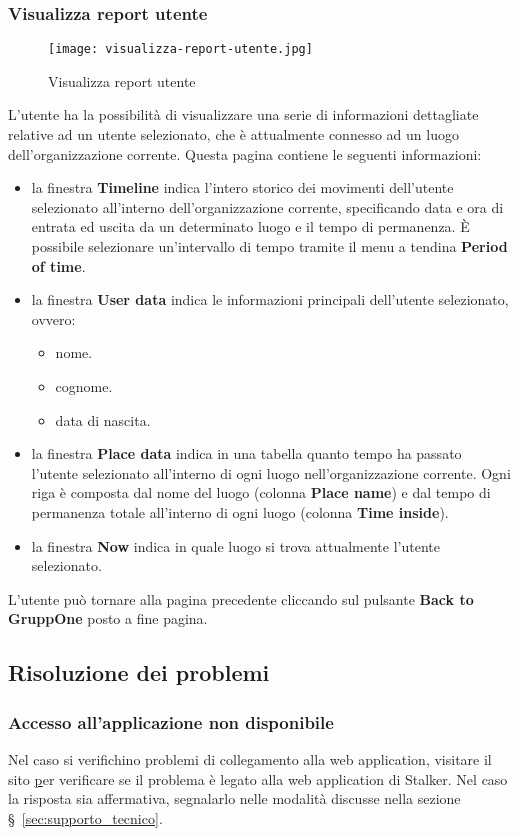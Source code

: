 \documentclass[../manuale-utente.tex]{subfiles}
\begin{document}
\subsubsection{Visualizza report utente}%
\label{subs:visualizza_report_utente}

\begin{figure}[H]
  \centering
  \texttt{[image: visualizza-report-utente.jpg]}
  \caption{Visualizza report utente}%
  \label{fig:web_app_visualizza-report-utente}
\end{figure}
L'utente ha la possibilità di visualizzare una serie di informazioni dettagliate relative ad un utente selezionato, che è attualmente connesso ad un luogo dell'organizzazione corrente.
Questa pagina contiene le seguenti informazioni:
\begin{itemize}
  \item la finestra \textbf{Timeline} indica l'intero storico dei movimenti dell'utente selezionato all'interno dell'organizzazione corrente, specificando data e ora di entrata ed uscita da un determinato luogo e il tempo di permanenza. È possibile selezionare un'intervallo di tempo tramite il menu a tendina \textbf{Period of time}.
  \item la finestra \textbf{User data} indica le informazioni principali dell'utente selezionato, ovvero:
  \begin{itemize}
    \item nome.
    \item cognome.
    \item data di nascita.
  \end{itemize}
  \item la finestra \textbf{Place data} indica in una tabella quanto tempo ha passato l'utente selezionato all'interno di ogni luogo nell'organizzazione corrente. Ogni riga è composta dal nome del luogo (colonna \textbf{Place name}) e dal tempo di permanenza totale all'interno di ogni luogo (colonna \textbf{Time inside}).
  \item la finestra \textbf{Now} indica in quale luogo si trova attualmente l'utente selezionato.
\end{itemize}
L'utente può tornare alla pagina precedente cliccando sul pulsante \textbf{Back to GruppOne} posto a fine pagina. %

\subsection{Risoluzione dei problemi}%
\label{subs:web_app_risoluzione_problemi}

\subsubsection{Accesso all'applicazione non disponibile}%
\label{subs:web_app_accesso_non_disponibile}

Nel caso si verifichino problemi di collegamento alla web application, visitare il sito \href{http://www.isitdownrightnow.com/} per verificare se il problema è legato alla web application di Stalker.
Nel caso la risposta sia affermativa, segnalarlo nelle modalità discusse nella sezione §~\ref{sec:supporto_tecnico}.
\end{document}
